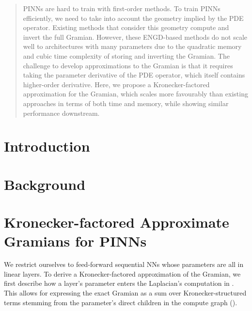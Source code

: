 \documentclass{article}
\begin{document}
\maketitle

\begin{abstract}
  PINNs are hard to train with first-order methods.
  To train PINNs efficiently, we need to take into account the geometry implied by the PDE operator.
  Existing methods that consider this geometry compute and invert the full Gramian.
  However, these ENGD-based methods do not scale well to architectures with many parameters due to the quadratic memory and cubic time complexity of storing and inverting the Gramian.
  The challenge to develop approximations to the Gramian is that it requires taking the parameter derivative of the PDE operator, which itself contains higher-order derivative.
  Here, we propose a Kronecker-factored approximation for the Gramian, which scales more favourably than existing approaches in terms of both time and memory, while showing similar performance downstream.
\end{abstract}


\section{Introduction}



\section{Background}





\section{Kronecker-factored Approximate Gramians for PINNs}

We restrict ourselves to feed-forward sequential NNs whose parameters are all in linear layers.
To derive a Kronecker-factored approximation of the Gramian, we first describe how a layer's parameter enters the Laplacian's computation in .
This allows for expressing the exact Gramian as a sum over Kronecker-structured terms stemming from the parameter's direct children in the compute graph ().
\end{document}
